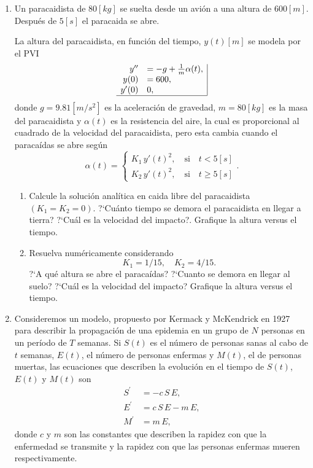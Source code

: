 \documentclass[letter,11pt]{article}
\begin{document}
\begin{enumerate}
\item Un paracaidista de $80[kg]$ se suelta desde un avi\'on a una altura de $600[m]$. Despu\'es de $5[s]$ el paracaida se abre.

La altura del paracaidista, en funci\'on del tiempo, $y(t)[m]$ se modela por el PVI
$$
\begin{array}{rl|}
y'' 	& = -g+\frac{1}{m}\alpha(t),\\
y(0)	& = 600,\\
y'(0)	& 0,\\ \hline
\end{array}
$$
donde $g=9.81[m/s^2]$ es la aceleraci\'on de gravedad, $m=80[kg]$ es la masa del paracaidista y $\alpha(t)$ es la resistencia del aire, la cual es proporcional al cuadrado de la velocidad del paracaidista, pero esta cambia cuando el paraca\'idas se abre seg\'un
$$
\alpha(t)=
\begin{cases}
K_1\, y'(t)^2 , \quad \text{si} \quad t<5[s]\\
K_2\, y'(t)^2 , \quad \text{si} \quad t\geq 5[s]
\end{cases}.
$$
\begin{enumerate}
\item Calcule la soluci\'on anal\'itica en caida libre del paracaidista $(K_1=K_2=0)$. ?`Cu\'anto tiempo se demora el paracaidista en llegar a tierra? ?`Cu\'al es la velocidad del impacto?. Grafique la altura versus el tiempo.
\item Resuelva num\'ericamente considerando 
$$
K_1=1/15, \quad K_2=4/15.
$$
?`A qu\'e altura se abre el paraca\'idas? ?`Cuanto se demora en llegar al suelo? ?`Cu\'al es la velocidad del impacto? Grafique la altura versus el tiempo.
\end{enumerate}



\item Consideremos un modelo, propuesto por Kermack y McKendrick en 1927 para describir la propagaci\'on de una epidemia en un grupo de $N$ personas en un per\'iodo de $T$ semanas.
Si $S(t)$ es el n\'umero de personas sanas al cabo de $t$ semanas, $E(t)$, el n\'umero de personas enfermas y $M(t)$, el de personas muertas, las ecuaciones que describen la evoluci\'on en el tiempo de $S(t)$, $E(t)$ y $M(t)$ son
\begin{align*}
S^{\prime} &= -c\,S\,E,\\
E^{\prime} &= c\,S\,E-m\,E,\\
M^{\prime} &= m\,E,
\end{align*}
donde $c$ y $m$ son las constantes que describen la rapidez con que la enfermedad se transmite
y la rapidez con que las personas enfermas mueren respectivamente.


\end{enumerate}
\end{document}
